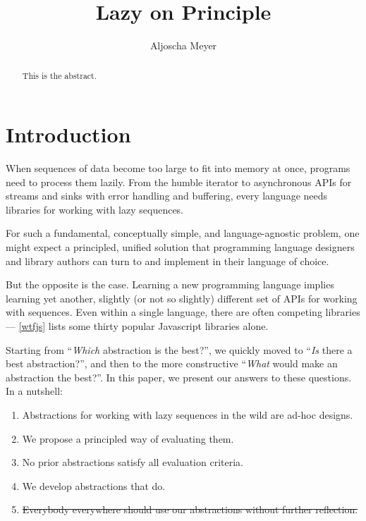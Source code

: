 \documentclass[sigplan,screen,10pt,anonymous,review]{acmart}
\title{Lazy on Principle}
\author{Aljoscha Meyer}
\affiliation{TU Berlin, Germany}
\begin{document}
\begin{abstract}
This is the abstract.
\end{abstract}

\maketitle

\section{Introduction}\label{introduction}

When sequences of data become too large to fit into memory at once, programs need to process them lazily. From the humble iterator to asynchronous APIs for streams and sinks with error handling and buffering, every language needs libraries for working with lazy sequences.

For such a fundamental, conceptually simple, and language-agnostic problem, one might expect a principled, unified solution that programming language designers and library authors can turn to and implement in their language of choice.

But the opposite is the case. Learning a new programming language implies learning yet another, slightly (or not so slightly) different set of APIs for working with sequences. Even within a single language, there are often competing libraries --- \cref{wtfjs} lists some thirty popular Javascript libraries alone.

Starting from ``\textit{Which} abstraction is the best?'', we quickly moved to ``\textit{Is} there a best abstraction?'', and then to the more constructive ``\textit{What} would make an abstraction the best?''. In this paper, we present our answers to these questions. In a nutshell:

\begin{enumerate}
    \item Abstractions for working with lazy sequences in the wild are ad-hoc designs.
    \item We propose a principled way of evaluating them.
    \item No prior abstractions satisfy all evaluation criteria.
    \item We develop abstractions that do.
    \item \sout{Everybody everywhere should use our abstractions without further reflection.}
\end{enumerate}
\end{document}
